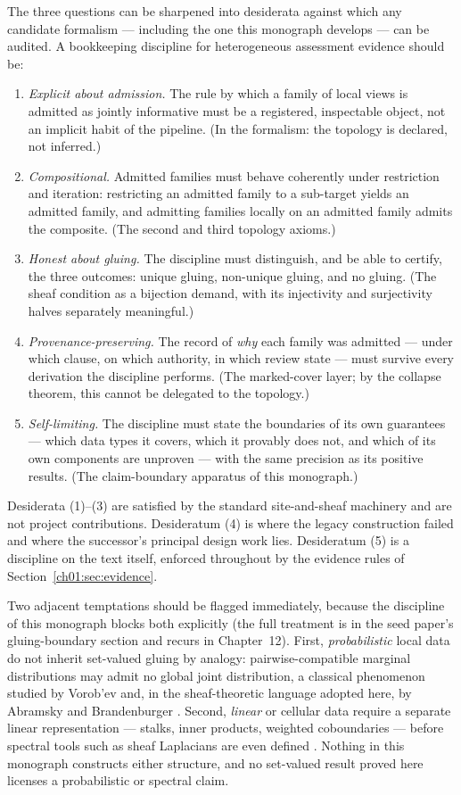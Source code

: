 The three questions can be sharpened into desiderata against which any
candidate formalism --- including the one this monograph develops --- can
be audited. A bookkeeping discipline for heterogeneous assessment evidence
should be:

\begin{enumerate}
\item \emph{Explicit about admission.} The rule by which a family of local
views is admitted as jointly informative must be a registered, inspectable
object, not an implicit habit of the pipeline. (In the formalism: the
topology is declared, not inferred.)
\item \emph{Compositional.} Admitted families must behave coherently under
restriction and iteration: restricting an admitted family to a sub-target
yields an admitted family, and admitting families locally on an admitted
family admits the composite. (The second and third topology axioms.)
\item \emph{Honest about gluing.} The discipline must distinguish, and be
able to certify, the three outcomes: unique gluing, non-unique gluing, and
no gluing. (The sheaf condition as a bijection demand, with its injectivity
and surjectivity halves separately meaningful.)
\item \emph{Provenance-preserving.} The record of \emph{why} each family
was admitted --- under which clause, on which authority, in which review
state --- must survive every derivation the discipline performs. (The
marked-cover layer; by the collapse theorem, this cannot be delegated to
the topology.)
\item \emph{Self-limiting.} The discipline must state the boundaries of
its own guarantees --- which data types it covers, which it provably does
not, and which of its own components are unproven --- with the same
precision as its positive results. (The claim-boundary apparatus of this
monograph.)
\end{enumerate}

Desiderata (1)--(3) are satisfied by the standard site-and-sheaf machinery
and are not project contributions. Desideratum (4) is where the legacy
construction failed and where the successor's principal design work lies.
Desideratum (5) is a discipline on the text itself, enforced throughout by
the evidence rules of Section~\ref{ch01:sec:evidence}.

Two adjacent temptations should be flagged immediately, because the
discipline of this monograph blocks both explicitly (the full treatment is
in the seed paper's gluing-boundary section and recurs in
Chapter~12). First, \emph{probabilistic} local data do not inherit
set-valued gluing by analogy: pairwise-compatible marginal distributions may
admit no global joint distribution, a classical phenomenon studied by
Vorob'ev \cite{vorobev} and, in the sheaf-theoretic language adopted here,
by Abramsky and Brandenburger \cite{abramskybrandenburger}. Second,
\emph{linear} or cellular data require a separate linear representation ---
stalks, inner products, weighted coboundaries --- before spectral tools such
as sheaf Laplacians are even defined \cite{hansenghrist}. Nothing in this
monograph constructs either structure, and no set-valued result proved here
licenses a probabilistic or spectral claim.


